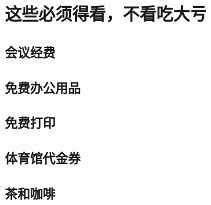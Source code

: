 
\chapter{这些必须得看，不看吃大亏}
\label{fuli}

\section{会议经费}
\section{免费办公用品}
\section{免费打印}
\section{体育馆代金券}
\section{茶和咖啡}



